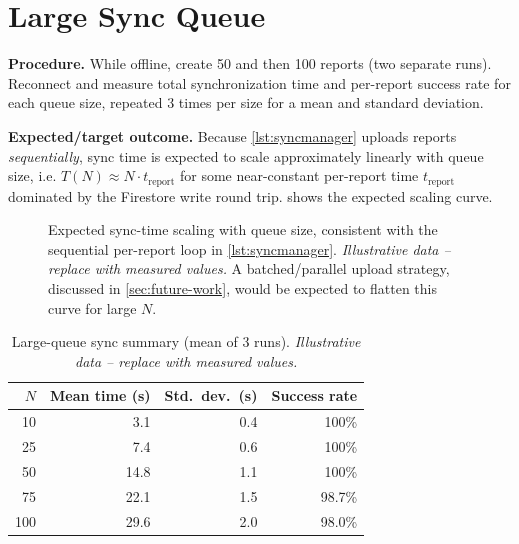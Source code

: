 \section{Large Sync Queue}
\label{sec:eval-large-queue}

\textbf{Procedure.} While offline, create 50 and then 100 reports (two
separate runs). Reconnect and measure total synchronization time and
per-report success rate for each queue size, repeated 3 times per size for
a mean and standard deviation.

\textbf{Expected/target outcome.} Because \cref{lst:syncmanager} uploads
reports \emph{sequentially}, sync time is expected to scale
approximately linearly with queue size, i.e. $T(N) \approx N \cdot
t_{\text{report}}$ for some near-constant per-report time
$t_{\text{report}}$ dominated by the Firestore write round trip.
 shows the expected scaling curve.

\begin{figure}[htbp]
  \centering
  \caption{Expected sync-time scaling with queue size, consistent with the
  sequential per-report loop in \cref{lst:syncmanager}. \emph{Illustrative
  data -- replace with measured values.} A batched/parallel upload
  strategy, discussed in \cref{sec:future-work}, would be expected to
  flatten this curve for large $N$.}
  \label{fig:sync-scaling}
\end{figure}

\begin{table}[htbp]
\centering
\caption{Large-queue sync summary (mean of 3 runs). \emph{Illustrative
data -- replace with measured values.}}
\label{tab:large-queue-illustrative}
\begin{tabular}{@{}rrrr@{}}
\toprule
\textbf{$N$} & \textbf{Mean time (s)} & \textbf{Std.\ dev.\ (s)} & \textbf{Success rate} \\
\midrule
10  & 3.1  & 0.4 & 100\% \\
25  & 7.4  & 0.6 & 100\% \\
50  & 14.8 & 1.1 & 100\% \\
75  & 22.1 & 1.5 & 98.7\% \\
100 & 29.6 & 2.0 & 98.0\% \\
\bottomrule
\end{tabular}
\end{table}

